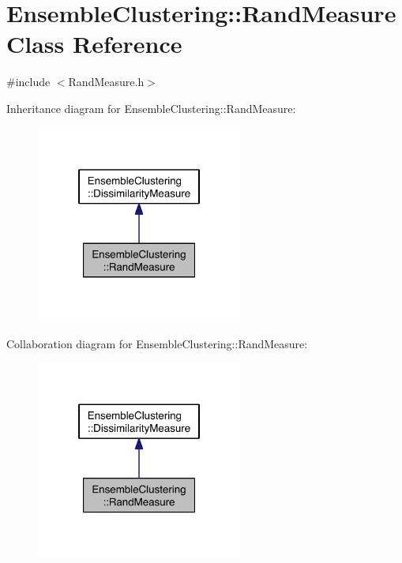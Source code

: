 \hypertarget{class_ensemble_clustering_1_1_rand_measure}{\section{Ensemble\-Clustering\-:\-:Rand\-Measure Class Reference}
\label{class_ensemble_clustering_1_1_rand_measure}
}


{\ttfamily \#include $<$Rand\-Measure.\-h$>$}



Inheritance diagram for Ensemble\-Clustering\-:\-:Rand\-Measure\-:
\nopagebreak
\begin{figure}[H]
\begin{center}
\leavevmode
\includegraphics[width=192pt]{class_ensemble_clustering_1_1_rand_measure__inherit__graph}
\end{center}
\end{figure}


Collaboration diagram for Ensemble\-Clustering\-:\-:Rand\-Measure\-:
\nopagebreak
\begin{figure}[H]
\begin{center}
\leavevmode
\includegraphics[width=192pt]{class_ensemble_clustering_1_1_rand_measure__coll__graph}
\end{center}
\end{figure}
